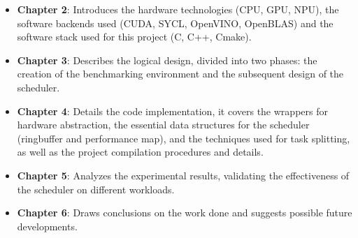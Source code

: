 \begin{itemize}
    \item \textbf{Chapter 2}: Introduces the hardware technologies (CPU, GPU, NPU), the software backends used (CUDA, SYCL, OpenVINO, OpenBLAS) and the software stack used for this project (C, C++, Cmake).

    \item \textbf{Chapter 3}: Describes the logical design, divided into two phases: the creation of the benchmarking environment and the subsequent design of the scheduler.    

    \item \textbf{Chapter 4}: Details the code implementation, it covers the wrappers for hardware abstraction, the essential data structures for the scheduler (ringbuffer and performance map), and the techniques used for task splitting, as well as the project compilation procedures and details.

    \item \textbf{Chapter 5}: Analyzes the experimental results, validating the effectiveness of the scheduler on different workloads.

    \item \textbf{Chapter 6}: Draws conclusions on the work done and suggests possible future developments.
\end{itemize}
